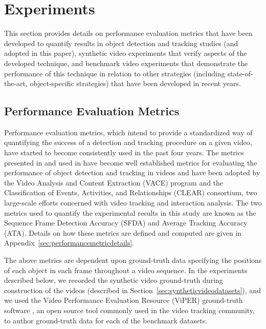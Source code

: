 \documentclass{article}
\begin{document}

\section{Experiments}
\label{sec:experiments}

This section provides details on performance evaluation metrics that have been developed to quantify results in object detection and tracking studies (and adopted in this paper), synthetic video experiments that verify aspects of the developed technique, and benchmark video experiments that demonstrate the performance of this technique in relation to other strategies (including state-of-the-art, object-specific strategies) that have been developed in recent years.   


\subsection{Performance Evaluation Metrics}
\label{sec:performanceevaluationmetrics}

Performance evaluation metrics, which intend to provide a standardized way of quantifying the success of a detection and tracking procedure on a given video, have started to become consistently used in the past four years. The metrics presented in \cite{kasturi_2008} and used in \cite{ellis_2010, taj_2007, lee_2009} have become well established metrics for evaluating the performance of object detection and tracking in videos and have been adopted by the Video Analysis and Content Extraction (VACE) program and the Classification of Events, Activities, and Relationships (CLEAR) consortium, two large-scale efforts concerned with video tracking and interaction analysis. The two metrics used to quantify the experimental results in this study are known as the Sequence Frame Detection Accuracy (SFDA) and Average Tracking Accuracy (ATA). Details on how these metrics are defined and computed are given in Appendix~\ref{sec:performancemetricdetails}.

The above metrics are dependent upon ground-truth data specifying the positions of each object in each frame throughout a video sequence. In the experiments described below, we recorded the synthetic video ground-truth during construction of the videos (described in Section~\ref{sec:syntheticvideodatasets}), and we used the Video Performance Evaluation Resource (ViPER) ground-truth software \cite{doermann_2000}, an open source tool commonly used in the video tracking community, to author ground-truth data for each of the benchmark datasets.
\end{document}
